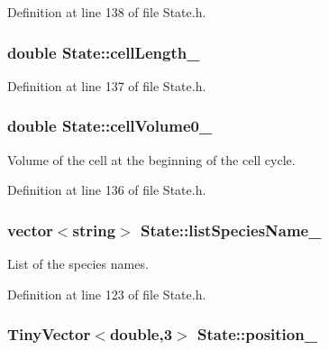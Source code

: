 \-Definition at line 138 of file \-State.\-h.

\hypertarget{class_state_aa7df5457c409b86df9a5be587726ba49}{
\subsubsection[{cell\-Length\-\_\-}]{\setlength{\rightskip}{0pt plus 5cm}double {\bf \-State\-::cell\-Length\-\_\-}}}\label{class_state_aa7df5457c409b86df9a5be587726ba49}


\-Definition at line 137 of file \-State.\-h.

\hypertarget{class_state_ad9506466f0cf4b294e606b8899fd6399}{
\subsubsection[{cell\-Volume0\-\_\-}]{\setlength{\rightskip}{0pt plus 5cm}double {\bf \-State\-::cell\-Volume0\-\_\-}}}\label{class_state_ad9506466f0cf4b294e606b8899fd6399}
\-Volume of the cell at the beginning of the cell cycle. 

\-Definition at line 136 of file \-State.\-h.

\hypertarget{class_state_a4f25db3d6595db7531c406b3bab9b2ea}{
\subsubsection[{list\-Species\-Name\-\_\-}]{\setlength{\rightskip}{0pt plus 5cm}vector$<$string$>$ {\bf \-State\-::list\-Species\-Name\-\_\-}}}\label{class_state_a4f25db3d6595db7531c406b3bab9b2ea}
\-List of the species names. 

\-Definition at line 123 of file \-State.\-h.

\hypertarget{class_state_a488acdebb1d3312dd543ff106358b706}{
\subsubsection[{position\-\_\-}]{\setlength{\rightskip}{0pt plus 5cm}\-Tiny\-Vector$<$double,3$>$ {\bf \-State\-::position\-\_\-}}}\label{class_state_a488acdebb1d3312dd543ff106358b706}



